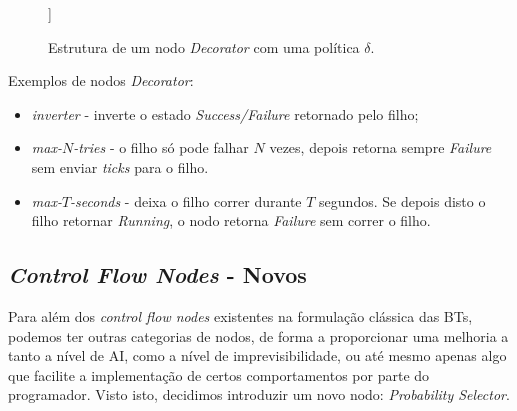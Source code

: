     \begin{figure}[H]
    \centering
    \begin{behavior}
        [\decorator{$\delta$},
            [\action{Child}]
        ]
    \end{behavior}
    \caption{Estrutura de um nodo \textit{Decorator} com uma política $\delta$.}
    \label{fig:2.5}
    \end{figure}
    
    Exemplos de nodos \textit{Decorator}:
    \begin{itemize}
        \item \textit{inverter} - inverte o estado \textit{Success/Failure} retornado pelo filho;
        \item \textit{max-$N$-tries} - o filho só pode falhar $N$ vezes, depois retorna sempre \textit{Failure} sem enviar \textit{ticks} para o filho.
        \item \textit{max-$T$-seconds} - deixa o filho correr durante $T$ segundos. Se depois disto o filho retornar \textit{Running}, o nodo retorna \textit{Failure} sem correr o filho.
    \end{itemize}




\subsection{\textit{Control Flow Nodes} - Novos}
Para além dos \textit{control flow nodes} existentes na formulação clássica das BTs, podemos ter outras categorias de nodos, de forma a proporcionar uma melhoria a tanto a nível de AI, como a nível de imprevisibilidade, ou até mesmo apenas algo que facilite a implementação de certos comportamentos por parte do programador.
Visto isto, decidimos introduzir um novo nodo: \textit{Probability Selector}.

